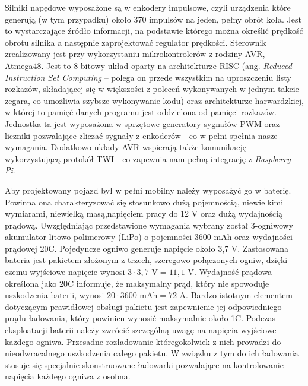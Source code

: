 Silniki napędowe wyposażone są w enkodery impulsowe, czyli  urządzenia które generują (w tym przypadku) około 370 impulsów na jeden, pełny obrót koła. Jest to wystarczające źródło informacji, na podstawie którego można określić prędkość obrotu silnika a następnie zaprojektować regulator prędkości. Sterownik zrealizowany jest przy wykorzystaniu  mikrokontrolerów z rodziny AVR, Atmega48. Jest to 8-bitowy układ oparty na architekturze RISC (ang. \textit{Reduced Instruction Set Computing} – polega on przede wszystkim na uproszczeniu listy rozkazów, składającej się w większości z poleceń wykonywanych w jednym takcie zegara, co umożliwia szybsze wykonywanie kodu) oraz architekturze harwardzkiej, w której to pamięć danych programu jest oddzielona od pamięci rozkazów. Jednostka ta jest wyposażona w sprzętowe generatory sygnałów PWM oraz liczniki pozwalające zliczać sygnały z enkoderów - co w pełni spełnia nasze wymagania. Dodatkowo układy AVR wspierają także komunikację wykorzystującą protokół TWI - co zapewnia nam pełną integrację z \textit{Raspberry Pi}.

Aby projektowany pojazd był w pełni mobilny należy wyposażyć go w baterię. Powinna ona charakteryzować się stosunkowo dużą pojemnością, niewielkimi wymiarami, niewielką masą,napięciem pracy do 12 V oraz dużą wydajnością prądową. Uwzględniając przedstawione wymagania wybrany został 3-ogniwowy akumulator litowo-polimerowy (LiPo) o pojemności 3600 mAh oraz wydajności prądowej 20C. Pojedyncze ogniwo generuje napięcie około 3,7 V. Zastosowana bateria jest pakietem złożonym z trzech, szeregowo połączonych ogniw, dzięki czemu wyjściowe napięcie wynosi $3\cdot3,7$ V$ = 11,1$ V. Wydajność prądowa określona jako 20C informuje, że maksymalny prąd, który nie spowoduje uszkodzenia baterii, wynosi $20\cdot3600$ mAh$=72$ A. Bardzo istotnym elementem dotyczącym prawidłowej obsługi pakietu jest zapewnienie jej odpowiedniego prądu ładowania, który powinien wynosić maksymalnie około 1C. Podczas eksploatacji baterii należy zwrócić szczególną uwagę na napięcia wyjściowe każdego ogniwa. Przesadne rozładowanie któregokolwiek z nich prowadzi do nieodwracalnego uszkodzenia całego pakietu. W związku z tym do ich ładowania stosuje się specjalnie skonstruowane ładowarki pozwalające na kontrolowanie napięcia każdego ogniwa z osobna.

